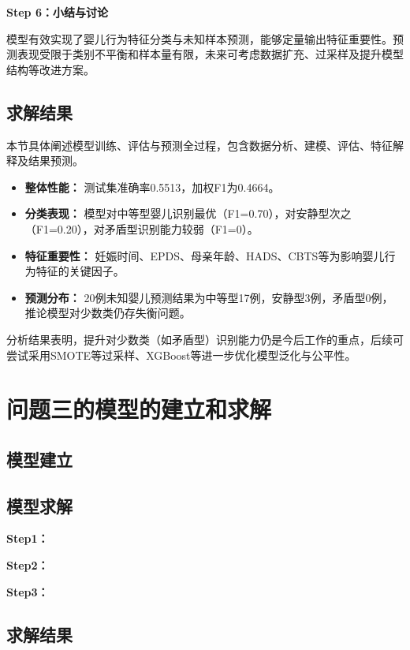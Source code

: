 \documentclass[withoutpreface,bwprint]{cumcmthesis}
\begin{document}
\textbf{Step 6：小结与讨论}

模型有效实现了婴儿行为特征分类与未知样本预测，能够定量输出特征重要性。预测表现受限于类别不平衡和样本量有限，未来可考虑数据扩充、过采样及提升模型结构等改进方案。




\subsection{求解结果}


本节具体阐述模型训练、评估与预测全过程，包含数据分析、建模、评估、特征解释及结果预测。





\begin{itemize}
    \item \textbf{整体性能：} 测试集准确率0.5513，加权F1为0.4664。
    \item \textbf{分类表现：} 模型对中等型婴儿识别最优（F1=0.70），对安静型次之（F1=0.20），对矛盾型识别能力较弱（F1=0）。
    \item \textbf{特征重要性：} 妊娠时间、EPDS、母亲年龄、HADS、CBTS等为影响婴儿行为特征的关键因子。
    \item \textbf{预测分布：} 20例未知婴儿预测结果为中等型17例，安静型3例，矛盾型0例，推论模型对少数类仍存失衡问题。
\end{itemize}

分析结果表明，提升对少数类（如矛盾型）识别能力仍是今后工作的重点，后续可尝试采用SMOTE等过采样、XGBoost等进一步优化模型泛化与公平性。

\section{问题三的模型的建立和求解}
\subsection{模型建立}

\subsection{模型求解}

\textbf{Step1：} 

\textbf{Step2：} 

\textbf{Step3：} 

\subsection{求解结果}
\end{document}
